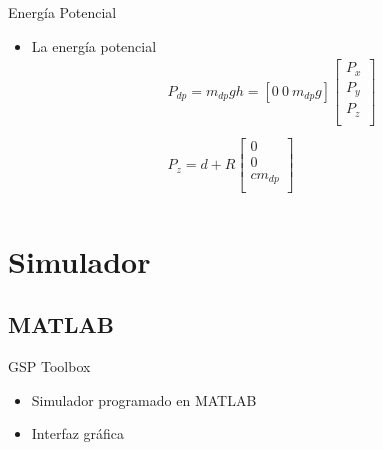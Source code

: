 \documentclass{beamer}
\begin{document}
\begin{frame}{Energía Potencial}
 \begin{itemize}
  \item La energía potencial
  \begin{equation}
\begin{split}
P_{dp} = m_{dp}gh = [0\ 0\ m_{dp}g] \begin{bmatrix}
P_x\\
P_y\\
P_z\\
\end{bmatrix}\\
\\
P_z = d + R\begin{bmatrix}
0\\
0\\
cm_{dp}\\
\end{bmatrix}\\
\end{split}
\end{equation}
  
 \end{itemize}

\end{frame}


\section{Simulador}
\subsection{MATLAB}
\begin{frame}{GSP Toolbox}
 \begin{itemize}
  \item Simulador programado en MATLAB
  \item Interfaz gráfica
 \end{itemize}

\end{frame}
\end{document}
